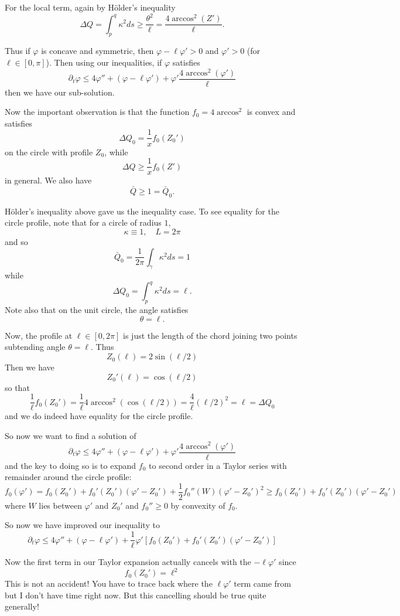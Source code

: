 \documentclass{amsart}
\begin{document}
For the local term, again by H\"older's inequality
\[
\Delta Q = \int_p^q \kappa^2 ds \geq \frac{\theta^2}{\ell} = \frac{4 \arccos^2(Z')}{\ell}.
\]

Thus if \(\varphi\) is concave and symmetric, then \(\varphi - \ell \varphi' > 0\) and \(\varphi' > 0\) (for \(\ell \in [0, \pi]\)). Then using our inequalities, if \(\varphi\) satisfies
\[
\partial_t \varphi \leq 4 \varphi'' + (\varphi - \ell \varphi') + \varphi' \frac{4 \arccos^2(\varphi')}{\ell}
\]
then we have our sub-solution.

Now the important observation is that the function \(f_0 = 4 \arccos^2\) is convex and satisfies
\[
\Delta Q_0 = \frac{1}{x} f_0(Z_0')
\]
on the circle with profile \(Z_0\), while
\[
\Delta Q \geq \frac{1}{x} f_0(Z')
\]
in general. We also have
\[
\bar{Q} \geq 1 = \bar{Q}_0.
\]

H\"older's inequality above gave us the inequality case. To see equality for the circle profile, note that for a circle of radius \(1\),
\[
\kappa \equiv 1, \quad L = 2\pi
\]
and so
\[
\bar{Q}_0 = \frac{1}{2\pi} \int_{\gamma} \kappa^2 ds = 1
\]
while
\[
\Delta Q_0 = \int_p^q \kappa^2 ds = \ell.
\]
Note also that on the unit circle, the angle satisfies
\[
\theta = \ell.
\]

Now, the profile at \(\ell \in [0, 2\pi]\) is just the length of the chord joining two points subtending angle \(\theta = \ell\). Thus
\[
Z_0(\ell) = 2 \sin(\ell/2)
\]
Then we have
\[
Z_0'(\ell) = \cos(\ell/2)
\]
so that
\[
\frac{1}{\ell} f_0(Z_0') = \frac{1}{\ell} 4 \arccos^2(\cos(\ell/2)) = \frac{4}{\ell} (\ell/2)^2 = \ell = \Delta Q_0
\]
and we do indeed have equality for the circle profile.

So now we want to find a solution of
\[
\partial_t \varphi \leq 4 \varphi'' + (\varphi - \ell \varphi') + \varphi' \frac{4\arccos^2(\varphi')}{\ell}
\]
and the key to doing so is to expand \(f_0\) to second order in a Taylor series with remainder around the circle profile:
\[
f_0(\varphi') = f_0(Z_0') + f_0'(Z_0')(\varphi' - Z_0') + \frac{1}{2} f_0''(W)(\varphi' - Z_0')^2 \geq f_0(Z_0') + f_0'(Z_0')(\varphi' - Z_0')
\]
where \(W\) lies between \(\varphi'\) and \(Z_0'\) and \(f_0''\geq 0\) by convexity of \(f_0\).

So now we have improved our inequality to
\[
\partial_t \varphi \leq 4 \varphi'' + (\varphi - \ell \varphi') + \frac{1}{\ell} \varphi' \left[f_0(Z_0') + f_0'(Z_0')(\varphi' - Z_0')\right]
\]

Now the first term in our Taylor expansion actually cancels with the \(-\ell\varphi'\) since
\[
f_0(Z_0') = \ell^2
\]
This is not an accident! You have to trace back where the \(\ell\varphi'\) term came from but I don't have time right now. But this cancelling should be true quite generally!
\end{document}
